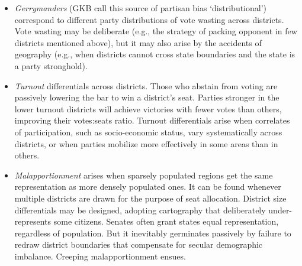 \documentclass[letter,12pt]{article}
\begin{document}
\begin{itemize}
\item \emph{Gerrymanders} (GKB call this source of partisan bias `distributional') correspond to different party distributions of vote wasting across districts. Vote wasting may be deliberate (e.g., the strategy of packing opponent in few districts mentioned above), but it may also arise by the accidents of geography (e.g., when districts cannot cross state boundaries and the state is a party stronghold).
\item \emph{Turnout} differentials across districts. Those who abstain from voting are passively lowering the bar to win a district's seat. Parties stronger in the lower turnout districts will achieve victories with fewer votes than others, improving their votes:seats ratio. Turnout differentials arise when correlates of participation, such as socio-economic status, vary systematically across districts, or when parties mobilize more effectively in some areas than in others. 
\item \emph{Malapportionment} arises when sparsely populated regions get the same representation as more densely populated ones. It can be found whenever multiple districts are drawn for the purpose of seat allocation. District size differentials may be designed, adopting cartography that deliberately under-represents some citizens. Senates often grant states equal representation, regardless of population. But it inevitably germinates passively by failure to redraw district boundaries that compensate for secular demographic imbalance. Creeping malapportionment ensues.
\end{itemize} 

\end{document}
